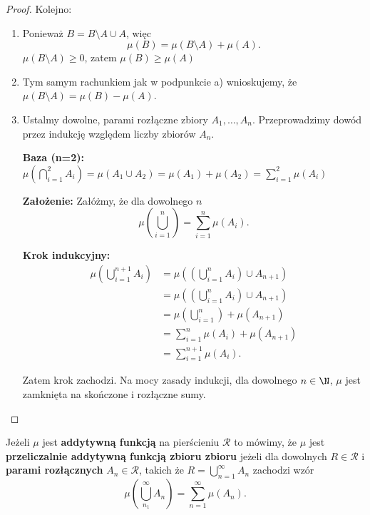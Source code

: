 \begin{proof}
	Kolejno:
	\begin{enumerate}[label=\alph*)]

		\item Ponieważ $B = B\setminus A \cup A$, więc \[
		\mu\left( B \right) = \mu\left( B\setminus A \right) + \mu\left( A \right) 
		.\]  
		$\mu\left( B\setminus A \right) \ge 0$, zatem $\mu\left( B \right) \ge  \mu\left( A \right) $ 
		\item Tym samym rachunkiem jak w podpunkcie a) wnioskujemy, że $\mu\left( B\setminus A \right) = \mu\left( B \right) - \mu\left( A \right) $.
		\item Ustalmy dowolne, parami rozłączne zbiory $A_1,\ldots, A_{n}$. Przeprowadzimy dowód przez indukcję względem liczby zbiorów $A_{n}$.

			\textbf{Baza (n=2):} $\mu\left(\bigcap_{i=1} ^{2} A_{i}\right) = \mu\left(A_{1} \cup A_{2} \right) = \mu\left( A_1 \right) + \mu\left( A_2 \right) = \sum_{i=1}^{2} \mu\left( A_{i} \right) $ 

			\textbf{Założenie:} Załóżmy, że dla dowolnego $n$
			\[
			\mu\left( \bigcup_{i=1} ^{n} \right) = \sum_{i=1}^{n} \mu\left( A_{i} \right) 
			.\] 

			\textbf{Krok indukcyjny:} 
	                \begin{align*}
				\mu\left( \bigcup_{i=1} ^{n+1} A_{i}\right) &= \mu\left( \left( \bigcup_{i=1} ^{n}A_{i} \right) \cup A_{n+1} \right)\\
			&= \mu\left( \left( \bigcup_{i=1} ^{n}A_{i} \right) \cup A_{n+1} \right) \\  
			&= \mu\left( \bigcup_{i=1} ^{n} \right) + \mu\left( A_{n+1} \right) \\
			&= \sum_{i=1}^{n} \mu\left( A_{i} \right) + \mu\left( A_{n+1} \right) \tag{Założenie indukcyjne}\\
			&= \sum_{i=1}^{n+1} \mu\left( A_{i} \right) 
	                .\end{align*}	
			
			Zatem krok zachodzi. Na mocy zasady indukcji, dla dowolnego $n\in \N$, $\mu$ jest zamknięta na skończone i rozłączne sumy.
	\end{enumerate}
\end{proof} 
\begin{definition}
	Jeżeli $\mu $ jest \textbf{addytywną funkcją} na pierścieniu $\mathcal{R}$ to mówimy, że $\mu $ jest \textbf{przeliczalnie addytywną funkcją zbioru zbioru} jeżeli dla dowolnych $R \in \mathcal{R}$ i \textbf{parami rozłącznych} $A_{n}\in \mathcal{R}$, takich że $R = \bigcup_{n=1} ^{\infty}A_{n}$ zachodzi wzór
	\[
	\mu \left( \bigcup_{n_1}^{\infty} A_{n}\right) = \sum_{n=1}^{\infty}\mu \left( A_{n} \right) 
	.\] 
\end{definition} 
